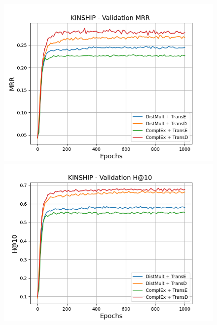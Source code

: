 \begin{figure}[H]
    \centering
    \begin{minipage}{.5\textwidth}
      \centering
      \includegraphics[width=\linewidth]{figures/results/gan_train/not_pretrained/uncertainty/max_distribution/entropy/kinship/1k_epochs/uncertainty_kinship_mrrs.png}
    \end{minipage}%
    \begin{minipage}{.5\textwidth}
      \centering
      \includegraphics[width=\linewidth]{figures/results/gan_train/not_pretrained/uncertainty/max_distribution/entropy/kinship/1k_epochs/uncertainty_kinship_hit10.png}
    \end{minipage}
    

\end{figure}
